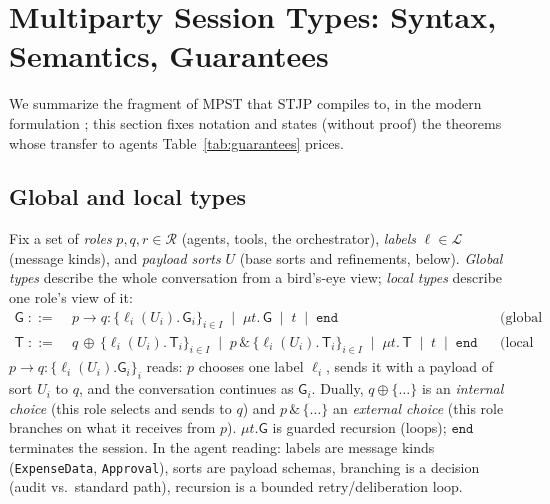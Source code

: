\documentclass{article}
\newcommand{\gtG}{\mathsf{G}}
\newcommand{\lt}{\mathsf{T}}
\newcommand{\ed}{\mathtt{end}}
\newcommand{\sends}{\rightarrow}
\newcommand{\lbl}{\ell}
\newcommand{\stjp}{\textsc{STJP}}
\begin{document}
\section{Multiparty Session Types: Syntax, Semantics, Guarantees}\label{sec:mpst}
We summarize the fragment of MPST that \stjp{} compiles to, in the modern formulation \citep{hyc08,scalas19}; this section fixes notation and states (without proof) the theorems whose transfer to agents Table~\ref{tab:guarantees} prices.

\subsection{Global and local types}
Fix a set of \emph{roles} $p,q,r\in\mathcal{R}$ (agents, tools, the orchestrator), \emph{labels} $\lbl\in\mathcal{L}$ (message kinds), and \emph{payload sorts} $U$ (base sorts and refinements, below). \emph{Global types} describe the whole conversation from a bird's-eye view; \emph{local types} describe one role's view of it:
\begin{align*}
\gtG \;::=\;& p \sends q : \{\lbl_i(U_i).\,\gtG_i\}_{i\in I} \;\mid\; \mu t.\,\gtG \;\mid\; t \;\mid\; \ed
&& \text{(global types)}\\
\lt \;::=\;& q\,{\oplus}\,\{\lbl_i(U_i).\,\lt_i\}_{i\in I} \;\mid\; p\,\&\,\{\lbl_i(U_i).\,\lt_i\}_{i\in I} \;\mid\; \mu t.\,\lt \;\mid\; t \;\mid\; \ed
&& \text{(local types)}
\end{align*}
$p \sends q:\{\lbl_i(U_i).\gtG_i\}_{i}$ reads: $p$ chooses one label $\lbl_i$, sends it with a payload of sort $U_i$ to $q$, and the conversation continues as $\gtG_i$. Dually, $q\oplus\{\ldots\}$ is an \emph{internal choice} (this role selects and sends to $q$) and $p\,\&\,\{\ldots\}$ an \emph{external choice} (this role branches on what it receives from $p$). $\mu t.\gtG$ is guarded recursion (loops); $\ed$ terminates the session. In the agent reading: labels are message kinds (\texttt{ExpenseData}, \texttt{Approval}), sorts are payload schemas, branching is a decision (audit vs.\ standard path), recursion is a bounded retry/deliberation loop.
\end{document}
